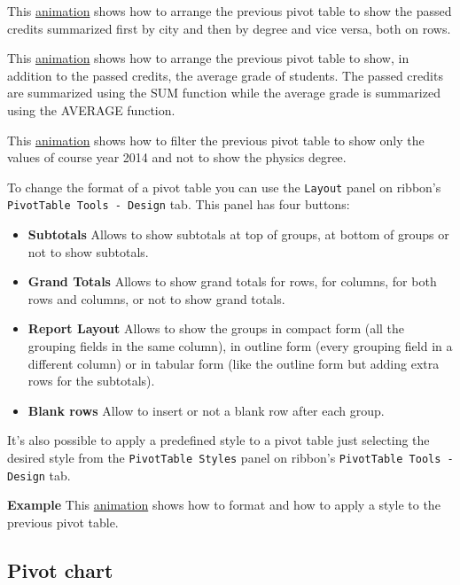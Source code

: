 This \href{http://aprendeconalf.es/office/excel/manual/img/example_pivot_table_2.gif}{animation} shows how to arrange the previous pivot table to show the passed credits summarized first by city and then by degree and vice versa, both on rows.

This \href{http://aprendeconalf.es/office/excel/manual/img/example_pivot_table_3.gif}{animation} shows how to arrange the previous pivot table to show, in addition to the passed credits, the average grade of students. The passed credits are summarized using the SUM function while the average grade is summarized using the AVERAGE function.

This \href{http://aprendeconalf.es/office/excel/manual/img/example_pivot_table_4.gif}{animation} shows how to filter the previous pivot table to show only the values of course year 2014 and not to show the physics degree.

To change the format of a pivot table you can use the \texttt{Layout} panel on ribbon's \texttt{PivotTable Tools - Design} tab. This panel has four buttons:

\begin{itemize}
\item \textbf{Subtotals} Allows to show subtotals at top of groups, at bottom of groups or not to show subtotals.
\item \textbf{Grand Totals} Allows to show grand totals for rows, for columns, for both rows and columns, or not to show grand totals.
\item \textbf{Report Layout} Allows to show the groups in compact form (all the grouping fields in the same column), in outline form (every grouping field in a different column) or in tabular form (like the outline form but adding extra rows for the subtotals).
\item \textbf{Blank rows} Allow to insert or not a blank row after each group.
\end{itemize}

It's also possible to apply a predefined style to a pivot table just selecting the desired style from the \texttt{PivotTable Styles}  panel on ribbon's \texttt{PivotTable Tools - Design} tab.

\textbf{Example} This \href{http://aprendeconalf.es/office/excel/manual/img/example_pivot_table_formatting.gif}{animation} shows how to format and how to apply a style to the previous pivot table.

\subsection{Pivot chart}\hypertarget{pivot-chart}{}\label{pivot-chart}

